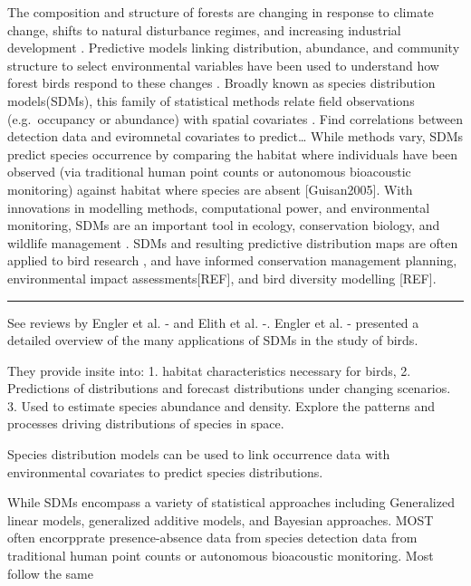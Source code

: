 \documentclass[manuscript, 3p,
authoryear]{elsarticle} %
\begin{document}
The composition and structure of forests are changing in response to
climate change, shifts to natural disturbance regimes, and increasing
industrial development \citep{Brandt2013}. Predictive models linking
distribution, abundance, and community structure to select environmental
variables have been used to understand how forest birds respond to these
changes
\citep{Carrillo-Rubio2014, Engler2017a, guisanPredictiveHabitatDistribution2000, He2015}.
Broadly known as species distribution models(SDMs), this family of
statistical methods relate field observations (e.g.~occupancy or
abundance) with spatial covariates \citep{Guisan2005}. Find correlations
between detection data and eviromnetal covariates to predict\ldots{}
While methods vary, SDMs predict species occurrence by comparing the
habitat where individuals have been observed (via traditional human
point counts or autonomous bioacoustic monitoring) against habitat where
species are absent {[}Guisan2005{]}. With innovations in modelling
methods, computational power, and environmental monitoring, SDMs are an
important tool in ecology, conservation biology, and wildlife management
\citep{Elith2009}. SDMs and resulting predictive distribution maps are
often applied to bird research \citet{englerAvianSDMsCurrent2017}, and
have informed conservation management planning, environmental impact
assessments{[}REF{]}, and bird diversity modelling
{[}REF{]}\citep{englerAvianSDMsCurrent2017, franklinMappingSpeciesDistributions2010}.

\begin{center}\rule{0.5\linewidth}{0.5pt}\end{center}

See reviews by Engler et al. -\citet{englerAvianSDMsCurrent2017} and
Elith et al. -\citet{Elith2009}. Engler et al.
-\citet{englerAvianSDMsCurrent2017} presented a detailed overview of the
many applications of SDMs in the study of birds.

They provide insite into: 1. habitat characteristics necessary for
birds, 2. Predictions of distributions and forecast distributions under
changing scenarios. 3. Used to estimate species abundance and density.
Explore the patterns and processes driving distributions of species in
space.

Species distribution models can be used to link occurrence data with
environmental covariates to predict species distributions.

While SDMs encompass a variety of statistical approaches including
Generalized linear models, generalized additive models, and Bayesian
approaches. MOST often encorpprate presence-absence data from species
detection data from traditional human point counts or autonomous
bioacoustic monitoring. Most follow the same
\end{document}
